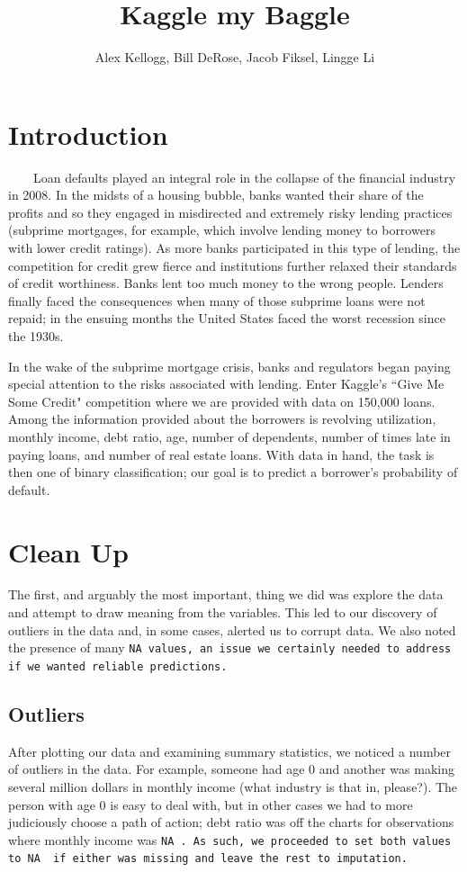 \documentclass[11pt, oneside]{article}   	%
\title{Kaggle my Baggle}
\author{Alex Kellogg, Bill DeRose, Jacob Fiksel, Lingge Li}
\begin{document}
\maketitle
\section{Introduction}
	 ~~~~Loan defaults played an integral role in the collapse of the financial industry in 2008. 
	In the midsts of a housing bubble, banks wanted their share of the profits and so they engaged in
	 misdirected and extremely risky lending practices (subprime mortgages, for example, which involve lending money to borrowers with lower credit ratings). 
	 As more banks participated in this type of lending, the competition for credit grew fierce and
	 institutions further relaxed their standards of credit worthiness. Banks  lent too 
	 much money to the wrong people. Lenders finally faced the consequences when many of 
	 those subprime loans were not repaid;  in the ensuing months the United States faced the 
	 worst recession since the 1930s. 
	 
	 In the wake of the subprime mortgage crisis, banks and regulators began paying special 
	 attention to the risks associated with lending. Enter Kaggle's ``Give Me Some Credit" competition where
	 we are provided with data on 150,000 loans. Among the information provided about the 
	 borrowers is revolving utilization, monthly income, debt ratio, age, number
	 of dependents, number of times late in paying loans, and number of real estate loans. 
	 With data in hand, the task is then one of binary classification; our goal is to predict a 
	 borrower's probability of default. 



\section{Clean Up}
	The first, and arguably the most important, thing we did was explore the data and attempt
	to draw meaning from the variables. This led to our discovery of outliers in the data and, in some
	cases, alerted us to corrupt data. We also noted the presence of many \tt NA\rm ~values, an issue we certainly needed to address if we wanted reliable predictions.
	
	
	\subsection{Outliers}
		After plotting our data and examining summary statistics, we noticed a number of outliers in the data. For example, someone had age 0 and another was making several million dollars in monthly income (what industry is that in, please?). The person with age 0 is easy to deal with, but 
		in other cases we had to more judiciously choose a path of action;
		debt ratio was off the charts for observations
		where monthly income was \tt NA\rm~. As such, we proceeded to set both values to \tt NA\rm~
		if either was missing and leave the rest to imputation.
\end{document}
